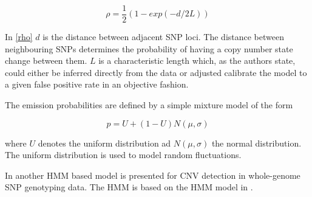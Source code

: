 \begin{equation}
\rho = \frac{1}{2}(1 - exp(-d/2L))
\label{rho}
\end{equation}

In \ref{rho} $d$ is the distance between adjacent SNP loci. 
The distance between neighbouring SNPs determines the probability of having a copy number state change between them.
$L$ is a characteristic length which, as the authors state, could either be inferred directly from the data or adjusted calibrate the
model to a given false positive rate in an objective fashion.

The emission probabilities are defined by a simple mixture model of the form

\begin{equation}
p = U + (1 - U)N(\mu, \sigma)
\end{equation}

where $U$ denotes the uniform distribution ad $N(\mu, \sigma)$ the normal distribution. The uniform distribution is used to model 
random fluctuations.

In \cite{Wang2007} another HMM based model is presented for CNV detection in whole-genome SNP genotyping data. The HMM is based on the HMM model in \cite{coella2007}.
